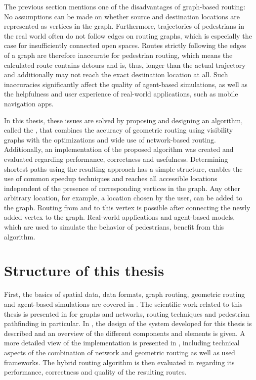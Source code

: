 	The previous section mentions one of the disadvantages of graph-based routing:
	No assumptions can be made on whether source and destination locations are represented as vertices in the graph.
	Furthermore, trajectories of pedestrians in the real world often do not follow edges on routing graphs, which is especially the case for insufficiently connected open spaces.
	Routes strictly following the edges of a graph are therefore inaccurate for pedestrian routing\cite{graser-osm-open-spaces}, which means the calculated route contains detours and is, thus, longer than the actual trajectory and additionally may not reach the exact destination location at all.
	Such inaccuracies significantly affect the quality of agent-based simulations, as well as the helpfulness and user experience of real-world applications, such as mobile navigation apps.
	
	In this thesis, these issues are solved by proposing and designing an algorithm, called the , that combines the accuracy of geometric routing using visibility graphs with the optimizations and wide use of network-based routing.
	Additionally, an implementation of the proposed algorithm was created and evaluated regarding performance, correctness and usefulness.
	Determining shortest paths using the resulting approach has a simple structure, enables the use of common speedup techniques and reaches all accessible locations independent of the presence of corresponding vertices in the graph.
	Any other arbitrary location, for example, a location chosen by the user, can be added to the graph.
	Routing from and to this vertex is possible after connecting the newly added vertex to the graph.
	Real-world applications and agent-based models, which are used to simulate the behavior of pedestrians, benefit from this algorithm.

\section{Structure of this thesis}
	
	First, the basics of spatial data, data formats, graph routing, geometric routing and agent-based simulations are covered in .
	The scientific work related to this thesis is presented in  for graphs and networks, routing techniques and pedestrian pathfinding in particular.
	In , the design of the system developed for this thesis is described and an overview of the different components and elements is given.
	A more detailed view of the implementation is presented in , including technical aspects of the combination of network and geometric routing as well as used frameworks.
	The hybrid routing algorithm is then evaluated in  regarding its performance, correctness and quality of the resulting routes.